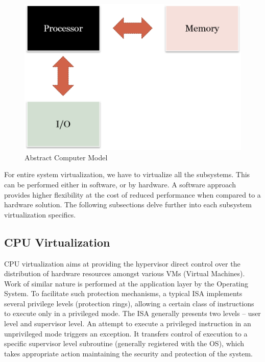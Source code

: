 \setlength{\belowcaptionskip}{-10pt}

\begin{figure}[H]
  \centering
  \includegraphics[scale=0.8]{figures/Mem_IO_CPU.png}
  \caption{Abstract Computer Model}
  \label{fig:mem_io}
\end{figure}
For entire system virtualization, we have to virtualize all the subsystems. This can be performed either in software, or by hardware. A software approach provides higher flexibility at the cost of reduced performance when compared to a hardware solution. The following subsections delve further into each subsystem virtualization specifics.

\subsection{CPU Virtualization}
CPU virtualization aims at providing the hypervisor direct control over the distribution of hardware resources amongst various VMs (Virtual Machines). Work of similar nature is performed at the application layer by the Operating System. To facilitate such protection mechanisms, a typical ISA implements several privilege levels (protection rings), allowing a certain class of instructions to execute only in a privileged mode. The ISA generally presents two levels -- user level and supervisor level. An attempt to execute a privileged instruction in an unprivileged mode triggers an exception. It transfers control of execution to a specific supervisor level subroutine (generally registered with the OS), which takes appropriate action maintaining the security and protection of the system.

\setlength{\belowcaptionskip}{-10pt}

